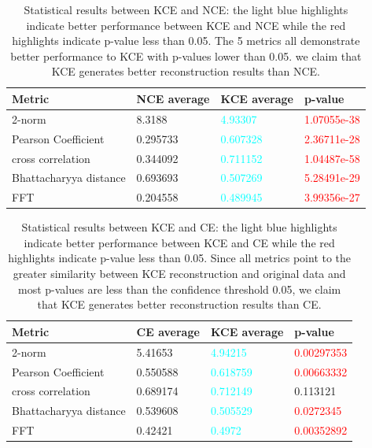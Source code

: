 \documentclass[12pt]{report} %
\begin{document}
\begin{table}[H]
	\centering
	\begin{tabular}{m{5cm}m{3cm}m{3cm}m{3cm}}
		\toprule
		Metric & NCE average & KCE average & p-value \\
		\midrule
		2-norm & 8.3188 & \textcolor{cyan}{4.93307} & \textcolor{red}{1.07055e-38} \\
		Pearson Coefficient & 0.295733 & \textcolor{cyan}{0.607328} & \textcolor{red}{2.36711e-28} \\
		cross correlation & 0.344092 & \textcolor{cyan}{0.711152} & \textcolor{red}{1.04487e-58} \\
		Bhattacharyya distance & 0.693693 & \textcolor{cyan}{0.507269} & \textcolor{red}{5.28491e-29} \\
		FFT & 0.204558 & \textcolor{cyan}{0.489945} & \textcolor{red}{3.99356e-27} \\
		\bottomrule
	\end{tabular}
    \caption{Statistical results between KCE and NCE: the light blue highlights indicate better performance between KCE and NCE while the red highlights indicate p-value less than 0.05. The 5 metrics all demonstrate better performance to KCE with p-values lower than 0.05. we claim that KCE generates better reconstruction results than NCE.}
\end{table}

\begin{table}[H]
	\centering
	\begin{tabular}{m{5cm}m{3cm}m{3cm}m{3cm}}
		\toprule
		Metric & CE average & KCE average & p-value \\
		\midrule
		2-norm & 5.41653 & \textcolor{cyan}{4.94215} & \textcolor{red}{0.00297353} \\
		Pearson Coefficient & 0.550588 & \textcolor{cyan}{0.618759} & \textcolor{red}{0.00663332} \\
		cross correlation & 0.689174 & \textcolor{cyan}{0.712149} & 0.113121 \\
		Bhattacharyya distance & 0.539608 & \textcolor{cyan}{0.505529} & \textcolor{red}{0.0272345} \\
		FFT & 0.42421 & \textcolor{cyan}{0.4972} & \textcolor{red}{0.00352892} \\
		\bottomrule
	\end{tabular}
	\caption{Statistical results between KCE and CE: the light blue highlights indicate better performance between KCE and CE while the red highlights indicate p-value less than 0.05. Since all metrics point to the greater similarity between KCE reconstruction and original data and most p-values are less than the confidence threshold 0.05, we claim that KCE generates better reconstruction results than CE.}
\end{table}
\end{document}
